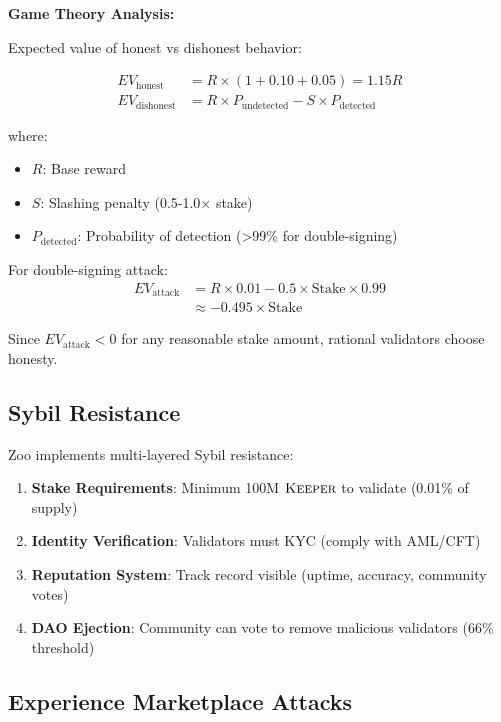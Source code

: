 \documentclass[11pt,letterpaper]{article}
\theoremstyle{definition}
\theoremstyle{remark}
\newcommand{\KEEPER}{\textsc{Keeper}}
\begin{document}
\textbf{Game Theory Analysis:}

Expected value of honest vs dishonest behavior:

\begin{align}
EV_{\text{honest}} &= R \times (1 + 0.10 + 0.05) = 1.15R \\
EV_{\text{dishonest}} &= R \times P_{\text{undetected}} - S \times P_{\text{detected}}
\end{align}

where:
\begin{itemize}
\item $R$: Base reward
\item $S$: Slashing penalty (0.5-1.0× stake)
\item $P_{\text{detected}}$: Probability of detection (>99\% for double-signing)
\end{itemize}

For double-signing attack:
\begin{align}
EV_{\text{attack}} &= R \times 0.01 - 0.5 \times \text{Stake} \times 0.99 \\
&\approx -0.495 \times \text{Stake}
\end{align}

Since $EV_{\text{attack}} < 0$ for any reasonable stake amount, rational validators choose honesty.

\subsection{Sybil Resistance}

Zoo implements multi-layered Sybil resistance:

\begin{enumerate}
\item \textbf{Stake Requirements}: Minimum 100M $\KEEPER$ to validate (0.01\% of supply)
\item \textbf{Identity Verification}: Validators must KYC (comply with AML/CFT)
\item \textbf{Reputation System}: Track record visible (uptime, accuracy, community votes)
\item \textbf{DAO Ejection}: Community can vote to remove malicious validators (66\% threshold)
\end{enumerate}

\subsection{Experience Marketplace Attacks}
\end{document}
